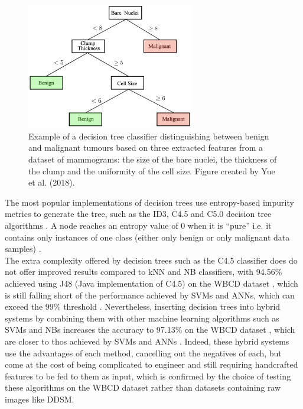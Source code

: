 \begin{figure}[ht]
\centerline{\includegraphics[width=0.65\textwidth]{Dissertation/figures/litsurvey/dt.png}}
\caption{\label{fig:litsurvey-dt-example}Example of a decision tree classifier distinguishing between benign and malignant tumours based on three extracted features from a dataset of mammograms: the size of the bare nuclei, the thickness of the clump and the uniformity of the cell size. Figure created by Yue et al. (2018).}
\end{figure}

The most popular implementations of decision trees use entropy-based impurity metrics to generate the tree, such as the ID3, C4.5 and C5.0 decision tree algorithms \citep{Yue2018}. A node reaches an entropy value of 0 when it is ``pure'' i.e. it contains only instances of one class (either only benign or only malignant data samples) \citep{Geron2019}.\\

The extra complexity offered by decision trees such as the C4.5 classifier does do not offer improved results compared to kNN and NB classifiers, with 94.56\% achieved using J48 (Java implementation of C4.5) on the WBCD dataset \citep{Sumbaly2014}, which is still falling short of the performance achieved by SVMs and ANNs, which can exceed the 99\% threshold \citep{Yue2018}. Nevertheless, inserting decision trees into hybrid systems by combining them with other machine learning algorithms such as SVMs and NBs increases the accuracy to 97.13\% on the WBCD dataset \citep{Kumar2017}, which are closer to thos achieved by SVMs and ANNs \citep{Yue2018}. Indeed, these hybrid systems use the advantages of each method, cancelling out the negatives of each, but come at the cost of being complicated to engineer and still requiring handcrafted features to be fed to them as input, which is confirmed by the choice of testing these algorithms on the WBCD dataset rather than datasets containing raw images like DDSM.

